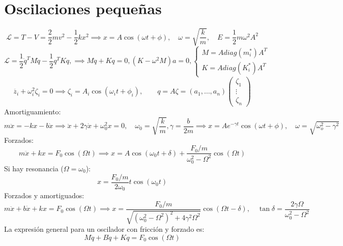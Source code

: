 \documentclass{myclass}
\newcommand{\1}{\tikz[baseline=(char.base)]{
            \node[shape=circle,draw,inner sep=1pt] (char) {1};}}
\newcommand{\2}{\tikz[baseline=(char.base)]{
            \node[shape=circle,draw,inner sep=1pt] (char) {2};}}
\renewcommand{\L}{\mathcal{L}}
\begin{document}
 \section{Oscilaciones pequeñas}
 $$
  \L = T-V = \frac{2}{2}mv^2 - \frac{1}{2}kx^2 \implies x = A\cos(\omega t + \phi),\quad \omega = \sqrt{\frac{k}{m}}, \quad E = \frac{1}{2} m\omega^2 A^2
 $$
 \[
 \L = \frac{1}{2} \dot{q}^T M \dot{q} - \frac{1}{2} q^T K q, \implies M \ddot{q} + Kq = 0, (K-\omega^2 M)a = 0, \begin{cases}
   M = Adiag(m^*_i)A^T \\
   K = Adiag(K^*_i)A^T 
 \end{cases}
 \] 
\[
\ddot{z_i} + \omega_i^2 \zeta_i = 0 \implies \zeta_i = A_i\cos(\omega_it + \phi_i), \qquad q = A\zeta = (a_1, \ldots, a_n)\begin{pmatrix} \zeta_1 \\ \vdots \\ \zeta_n \end{pmatrix} 
\] 
Amortiguamiento:
\[
m\ddot{x} = -kx -b \dot{x} \implies \ddot{x} + 2 \gamma \dot{x} + \omega_0^2x = 0, \quad \omega_0 = \sqrt{\frac{k}{m}}, \gamma = \frac{b}{2m} \implies x = Ae^{-\gamma t}\cos(\omega t+ \phi), \quad \omega = \sqrt{\omega_o^2 - \gamma^2} 
\] 
Forzados:
 \[
m \ddot{x} + kx = F_0\cos(\Omega t) \implies x =  A\cos(\omega_0 t + \delta)  + \frac{F_0 / m}{\omega_0^2 -\Omega^2}\cos(\Omega t)
\] 
Si hay resonancia ($\Omega = \omega_0$):
\[
x = \frac{F_0/m}{2\omega_0}t\cos(\omega_0t)
\] 
Forzados y amortiguados:
 \[
m \ddot{x} +b\dot{x}+ kx = F_0\cos(\Omega t) \implies x =  \frac{F_0/m}{\sqrt{(\omega_0^2-\Omega^2)^2 + 4\gamma^2\Omega^2}} \cos(\Omega t - \delta), \quad \tan \delta = \frac{2\gamma \Omega}{\omega_0^2 - \Omega^2}
\] 
La expresión general para un oscilador con fricción y forzado es:
 \[
M\ddot{q} + B\dot{q} + Kq = F_0\cos(\Omega t)
\] 
\end{document}
